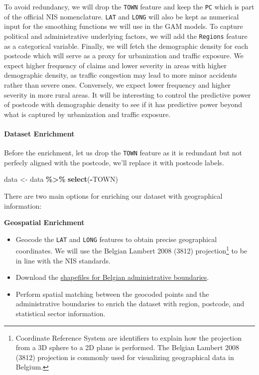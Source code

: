 \documentclass[
  english,
  11pt,
]{article}
\newenvironment{Shaded}{\begin{snugshade}}{\end{snugshade}}
\newcommand{\FunctionTok}[1]{\textcolor[rgb]{0.13,0.29,0.53}{\textbf{#1}}}
\newcommand{\NormalTok}[1]{#1}
\newcommand{\OtherTok}[1]{\textcolor[rgb]{0.56,0.35,0.01}{#1}}
\newcommand{\SpecialCharTok}[1]{\textcolor[rgb]{0.81,0.36,0.00}{\textbf{#1}}}
\providecommand{\tightlist}{%
  \setlength{\itemsep}{0pt}\setlength{\parskip}{0pt}}
\begin{document}
To avoid redundancy, we will drop the \texttt{TOWN} feature and keep the
\texttt{PC} which is part of the official NIS nomenclature. \texttt{LAT}
and \texttt{LONG} will also be kept as numerical input for the smoothing
functions we will use in the GAM models. To capture political and
administrative underlying factors, we will add the \texttt{Regions}
feature as a categorical variable. Finally, we will fetch the
demographic density for each postcode which will serve as a proxy for
urbanization and traffic exposure. We expect higher frequency of claims
and lower severity in areas with higher demographic density, as traffic
congestion may lead to more minor accidents rather than severe ones.
Conversely, we expect lower frequency and higher severity in more rural
areas. It will be interesting to control the predictive power of
postcode with demographic density to see if it has predictive power
beyond what is captured by urbanization and traffic exposure.

\paragraph{Dataset Enrichment}\label{dataset-enrichment}

Before the enrichment, let us drop the \texttt{TOWN} feature as it is
redundant but not perfecly aligned with the postcode, we'll replace it
with postcode labels.

\begin{Shaded}
\begin{Highlighting}[]
\NormalTok{data }\OtherTok{\textless{}{-}}\NormalTok{ data }\SpecialCharTok{\%\textgreater{}\%} \FunctionTok{select}\NormalTok{(}\SpecialCharTok{{-}}\NormalTok{TOWN)}
\end{Highlighting}
\end{Shaded}

There are two main options for enriching our dataset with geographical
information:

\textbf{Geospatial Enrichment}

\begin{itemize}
\tightlist
\item
  Geocode the \texttt{LAT} and \texttt{LONG} features to obtain precise
  geographical coordinates. We will use the Belgian Lambert 2008 (3812)
  projection\footnote{Coordinate Reference System are identifiers to
    explain how the projection from a 3D sphere to a 2D plane is
    performed. The Belgian Lambert 2008 (3812) projection is commonly
    used for visualizing geographical data in Belgium.} to be in line
  with the NIS standards.
\item
  Download the
  \href{https://statbel.fgov.be/en/open-data/statistical-sectors-2025}{shapefiles
  for Belgian administrative boundaries}.
\item
  Perform spatial matching between the geocoded points and the
  administrative boundaries to enrich the dataset with region, postcode,
  and statistical sector information.
\end{itemize}
\end{document}
